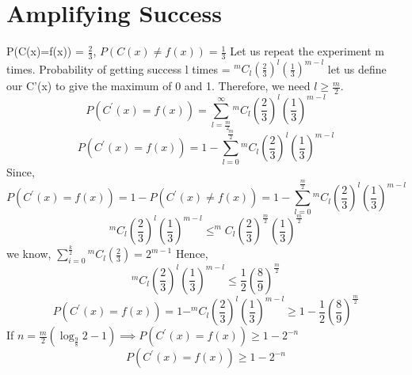 \documentclass[11pt, a4paper]{article}
\begin{document}
\section{Amplifying Success}
P(C(x)=f(x)) = \(\frac{2}{3}\), \(P(C(x)\neq f(x)) = \frac{1}{3}\) 
Let us repeat the experiment m times. 
Probability of getting success l times = \(^mC_l \left(\frac{2}{3}\right)^l\left(\frac{1}{3}\right)^{m-l}\) 
let us define our C'(x) to give the maximum of 0 and 1. 
Therefore, we need \(l\geq \frac{m}{2}\).
\[
    P(C^\prime (x) = f(x)) = \sum\limits_{l=\frac{m}{2}}^{\infty} ^mC_l \left(\frac{2}{3}\right)^l\left(\frac{1}{3}\right)^{m-l}
\]
\[
    P(C^\prime (x) = f(x)) = 1 - \sum\limits_{l=0}^{\frac{m}{2}} ^mC_l \left(\frac{2}{3}\right)^l\left(\frac{1}{3}\right)^{m-l}
\]
Since, 
\[ P(C^\prime (x)= f(x))=1-P(C^\prime(x) \neq f(x)) = 1- \sum\limits_{l=0}^{\frac{m}{2}} ^mC_l \left(\frac{2}{3}\right)^l\left(\frac{1}{3}\right)^{m-l} \] 
\[
    ^mC_l \left(\frac{2}{3}\right)^l\left(\frac{1}{3}\right)^{m-l} \leq ^mC_l \left(\frac{2}{3}\right)^{\frac{m}{2}}\left(\frac{1}{3}\right)^{\frac{m}{2}}
\]
we know, \(\sum_{i=0}^{\frac{k}{2}} ^mC_l (\frac{2}{3}) = 2^{m-1}\) 
Hence, 
\[
    ^mC_l \left(\frac{2}{3}\right)^l\left(\frac{1}{3}\right)^{m-l} \leq \frac{1}{2}\left(\frac{8}{9}\right)^\frac{m}{2} 
\]
\[
    P(C^\prime (x)=f(x)) = 1 -  ^mC_l \left(\frac{2}{3}\right)^l\left(\frac{1}{3}\right)^{m-l} \geq 1-\frac{1}{2}\left(\frac{8}{9}\right)^\frac{m}{2}
\]
If \(n = \frac{m}{2}(\log _\frac{9}{8} 2 -1) \implies P(C^\prime (x)=f(x))\geq 1-2^{-n} \)
\[
    \boxed{P(C^\prime (x)=f(x))\geq 1-2^{-n}}
\] 
\end{document}
